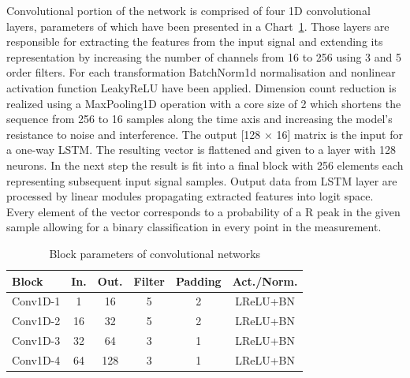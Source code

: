 \documentclass[journal]{IEEEtran}
\begin{document}
{Convolutional portion of the network is comprised of four 1D convolutional layers, parameters of which have been presented in a Chart~\ref{tab:ecg_layers}. Those layers are responsible for extracting the features from the input signal and extending its representation by increasing the number of channels from 16 to 256 using 3 and 5 order filters. For each transformation BatchNorm1d normalisation and nonlinear activation function LeakyReLU have been applied. Dimension count reduction is realized using a MaxPooling1D operation with a core size of 2 which shortens the sequence from 256 to 16 samples along the time axis and increasing the model's resistance to noise and interference. The output [128 × 16] matrix is the input for a one-way LSTM. The resulting vector is flattened and given to a layer with 128 neurons. In the next step the result is fit into a final block with 256 elements each representing subsequent input signal samples. Output data from LSTM layer are processed by linear modules propagating extracted features into logit space. Every element of the vector corresponds to a probability of a R peak in the given sample allowing for a binary classification in every point in the measurement.

\begin{table}[h!]
\centering
\caption{Block parameters of convolutional networks}
\label{tab:ecg_layers}
\begin{tabular}{|l|c|c|c|c|c|}
\hline
\textbf{Block} & \textbf{In.} & \textbf{Out.} & \textbf{Filter} & \textbf{Padding} & \textbf{Act./Norm.} \\
\hline
Conv1D-1 & 1   & 16  & 5 & 2 & LReLU+BN \\
Conv1D-2 & 16  & 32  & 5 & 2 & LReLU+BN \\
Conv1D-3 & 32  & 64  & 3 & 1 & LReLU+BN \\
Conv1D-4 & 64  & 128 & 3 & 1 & LReLU+BN \\
\hline
\end{tabular}
\end{table}

}
\end{document}
